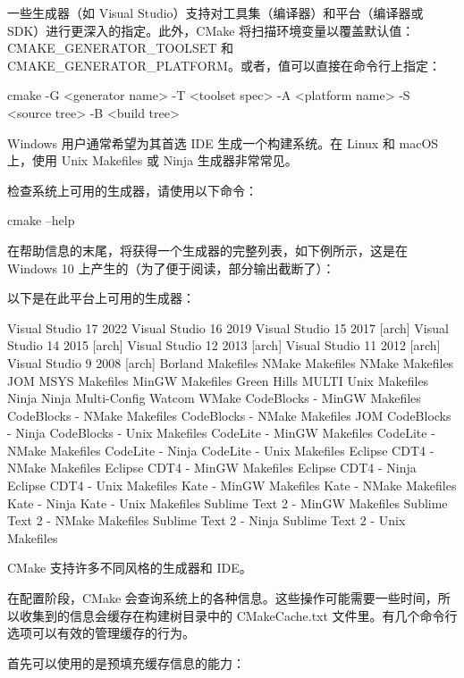 一些生成器（如 Visual Studio）支持对工具集（编译器）和平台（编译器或 SDK）进行更深入的指定。此外，CMake 将扫描环境变量以覆盖默认值：CMAKE\_GENERATOR\_TOOLSET 和 CMAKE\_GENERATOR\_PLATFORM。或者，值可以直接在命令行上指定：

\begin{shell}
cmake -G <generator name>
      -T <toolset spec>
      -A <platform name>
      -S <source tree> -B <build tree>
\end{shell}

Windows 用户通常希望为其首选 IDE 生成一个构建系统。在 Linux 和 macOS 上，使用 Unix Makefiles 或 Ninja 生成器非常常见。

检查系统上可用的生成器，请使用以下命令：

\begin{shell}
cmake --help
\end{shell}

在帮助信息的末尾，将获得一个生成器的完整列表，如下例所示，这是在 Windows 10 上产生的（为了便于阅读，部分输出截断了）：

以下是在此平台上可用的生成器：

\begin{shell}
Visual Studio 17 2022
Visual Studio 16 2019
Visual Studio 15 2017 [arch]
Visual Studio 14 2015 [arch]
Visual Studio 12 2013 [arch]
Visual Studio 11 2012 [arch]
Visual Studio 9 2008 [arch]
Borland Makefiles
NMake Makefiles
NMake Makefiles JOM
MSYS Makefiles
MinGW Makefiles
Green Hills MULTI
Unix Makefiles
Ninja
Ninja Multi-Config
Watcom WMake
CodeBlocks - MinGW Makefiles
CodeBlocks - NMake Makefiles
CodeBlocks - NMake Makefiles JOM
CodeBlocks - Ninja
CodeBlocks - Unix Makefiles
CodeLite - MinGW Makefiles
CodeLite - NMake Makefiles
CodeLite - Ninja
CodeLite - Unix Makefiles
Eclipse CDT4 - NMake Makefiles
Eclipse CDT4 - MinGW Makefiles
Eclipse CDT4 - Ninja
Eclipse CDT4 - Unix Makefiles
Kate - MinGW Makefiles
Kate - NMake Makefiles
Kate - Ninja
Kate - Unix Makefiles
Sublime Text 2 - MinGW Makefiles
Sublime Text 2 - NMake Makefiles
Sublime Text 2 - Ninja
Sublime Text 2 - Unix Makefiles
\end{shell}

CMake 支持许多不同风格的生成器和 IDE。


在配置阶段，CMake 会查询系统上的各种信息。这些操作可能需要一些时间，所以收集到的信息会缓存在构建树目录中的 CMakeCache.txt 文件里。有几个命令行选项可以有效的管理缓存的行为。

首先可以使用的是预填充缓存信息的能力：

